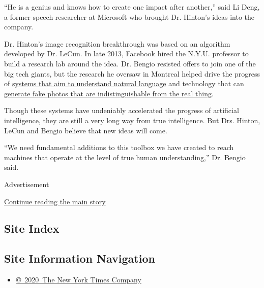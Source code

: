 ``He is a genius and knows how to create one impact after another,''
said Li Deng, a former speech researcher at Microsoft who brought Dr.
Hinton's ideas into the company.

Dr. Hinton's image recognition breakthrough was based on an algorithm
developed by Dr. LeCun. In late 2013, Facebook hired the N.Y.U.
professor to build a research lab around the idea. Dr. Bengio resisted
offers to join one of the big tech giants, but the research he oversaw
in Montreal helped drive the progress of
\href{https://www.nytimes3xbfgragh.onion/2018/11/18/technology/artificial-intelligence-language.html}{systems
that aim to understand natural language} and technology that can
\href{https://www.nytimes3xbfgragh.onion/interactive/2018/01/02/technology/ai-generated-photos.html}{generate
fake photos that are indistinguishable from the real thing}.

Though these systems have undeniably accelerated the progress of
artificial intelligence, they are still a very long way from true
intelligence. But Drs. Hinton, LeCun and Bengio believe that new ideas
will come.

``We need fundamental additions to this toolbox we have created to reach
machines that operate at the level of true human understanding,'' Dr.
Bengio said.

Advertisement

\protect\hyperlink{after-bottom}{Continue reading the main story}

\hypertarget{site-index}{%
\subsection{Site Index}\label{site-index}}

\hypertarget{site-information-navigation}{%
\subsection{Site Information
Navigation}\label{site-information-navigation}}

\begin{itemize}
\tightlist
\item
  \href{https://help.nytimes3xbfgragh.onion/hc/en-us/articles/115014792127-Copyright-notice}{©~2020~The
  New York Times Company}
\end{itemize}

